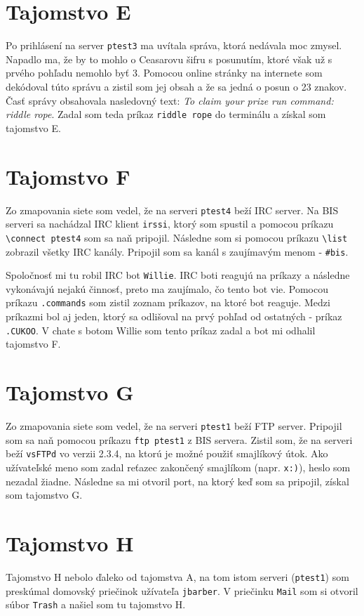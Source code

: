 \documentclass[]{article}
\begin{document}
\section*{Tajomstvo E}
Po prihlásení na server \texttt{ptest3} ma uvítala správa, ktorá nedávala moc zmysel. Napadlo ma, že by to mohlo o Ceasarovu šifru s posunutím, ktoré však už s prvého pohľadu nemohlo byť 3. Pomocou online stránky na internete som dekódoval túto správu a zistil som jej obsah a že sa jedná o posun o 23 znakov. Časť správy obsahovala nasledovný text: \textit{To claim your prize run command: riddle rope}. Zadal som teda príkaz \texttt{riddle rope} do terminálu a získal som tajomstvo E.

\section*{Tajomstvo F}
Zo zmapovania siete som vedel, že na serveri \texttt{ptest4} beží IRC server. Na BIS serveri sa nachádzal IRC klient \texttt{irssi}, ktorý som spustil a pomocou príkazu \texttt{\textbackslash connect ptest4} som sa naň pripojil. Následne som si pomocou príkazu \texttt{\textbackslash list} zobrazil všetky IRC kanály. Pripojil som sa kanál s zaujímavým menom \-- \texttt{\#bis}. 

Spoločnosť mi tu robil IRC bot \texttt{Willie}. IRC boti reagujú na príkazy a následne vykonávajú nejakú činnosť, preto ma zaujímalo, čo tento bot vie. Pomocou príkazu \texttt{.commands} som zistil zoznam príkazov, na ktoré bot reaguje. Medzi príkazmi bol aj jeden, ktorý sa odlišoval na prvý pohľad od ostatných \-- príkaz \texttt{.CUKOO}. V chate s botom Willie som tento príkaz zadal a bot mi odhalil tajomstvo F.

\section*{Tajomstvo G}
Zo zmapovania siete som vedel, že na serveri \texttt{ptest1} beží FTP server. Pripojil som sa naň pomocou príkazu \texttt{ftp ptest1} z BIS servera. Zistil som, že na serveri beží \texttt{vsFTPd} vo verzii 2.3.4, na ktorú je možné použiť smajlíkový útok. Ako užívateľské meno som zadal reťazec zakončený smajlíkom (napr. \texttt{x:)}), heslo som nezadal žiadne. Následne sa mi otvoril port, na ktorý keď som sa pripojil, získal som tajomstvo G.

\section*{Tajomstvo H}
Tajomstvo H nebolo ďaleko od tajomstva A, na tom istom serveri (\texttt{ptest1}) som preskúmal domovský priečinok užívateľa \texttt{jbarber}. V priečinku \texttt{Mail} som si otvoril súbor \texttt{Trash} a našiel som tu tajomstvo H.
\end{document}
